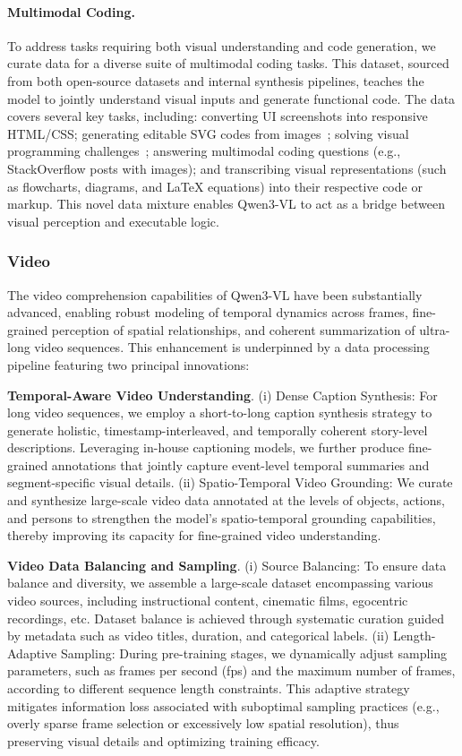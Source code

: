 \documentclass{article} %
\begin{document}
\paragraph{Multimodal Coding.} To address tasks requiring both visual understanding and code generation, we curate data for a diverse suite of multimodal coding tasks. This dataset, sourced from both open-source datasets and internal synthesis pipelines, teaches the model to jointly understand visual inputs and generate functional code. The data covers several key tasks, including: converting UI screenshots into responsive HTML/CSS; generating editable SVG codes from images~\citep{likaixin2025iconstack}; solving visual programming challenges~\citep{li2024mmcode}; answering multimodal coding questions (e.g., StackOverflow posts with images); and transcribing visual representations (such as flowcharts, diagrams, and \LaTeX{} equations) into their respective code or markup. This novel data mixture enables Qwen3-VL to act as a bridge between visual perception and executable logic.

\subsubsection{Video}

The video comprehension capabilities of Qwen3-VL have been substantially advanced, enabling robust modeling of temporal dynamics across frames, fine-grained perception of spatial relationships, and coherent summarization of ultra-long video sequences.
This enhancement is underpinned by a data processing pipeline featuring two principal innovations:

\textbf{Temporal-Aware Video Understanding}. 
(i) Dense Caption Synthesis: For long video sequences, we employ a short-to-long caption synthesis strategy to generate holistic, timestamp-interleaved, and temporally coherent story-level descriptions. Leveraging in-house captioning models, we further produce fine-grained annotations that jointly capture event-level temporal summaries and segment-specific visual details.
(ii) Spatio-Temporal Video Grounding: We curate and synthesize large-scale video data annotated at the levels of objects, actions, and persons to strengthen the model’s spatio-temporal grounding capabilities, thereby improving its capacity for fine-grained video understanding.

\textbf{Video Data Balancing and Sampling}. 
(i) Source Balancing: To ensure data balance and diversity, we assemble a large-scale dataset encompassing various video sources, including instructional content, cinematic films, egocentric recordings, etc. Dataset balance is achieved through systematic curation guided by metadata such as video titles, duration, and categorical labels.
(ii) Length-Adaptive Sampling: During pre-training stages, we dynamically adjust sampling parameters, such as frames per second (fps) and the maximum number of frames, according to different sequence length constraints. 
This adaptive strategy mitigates information loss associated with suboptimal sampling practices (e.g., overly sparse frame selection or excessively low spatial resolution), thus preserving visual details and optimizing training efficacy.
\end{document}
